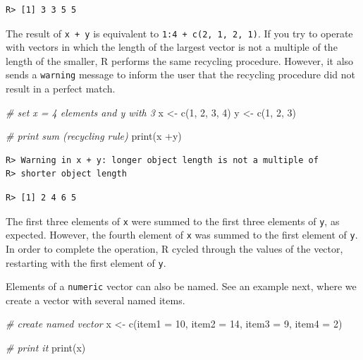 \documentclass[
  12pt,
]{book}
\newenvironment{Shaded}{\begin{snugshade}}{\end{snugshade}}
\newcommand{\AttributeTok}[1]{\textcolor[rgb]{0.61,0.61,0.61}{#1}}
\newcommand{\CommentTok}[1]{\textcolor[rgb]{0.37,0.37,0.37}{\textit{#1}}}
\newcommand{\DecValTok}[1]{\textcolor[rgb]{0.06,0.06,0.06}{#1}}
\newcommand{\FunctionTok}[1]{\textcolor[rgb]{0,0,0}{#1}}
\newcommand{\NormalTok}[1]{#1}
\newcommand{\OtherTok}[1]{\textcolor[rgb]{0.37,0.37,0.37}{#1}}
\newcommand{\SpecialCharTok}[1]{\textcolor[rgb]{0,0,0}{#1}}
\begin{document}
\begin{verbatim}
R> [1] 3 3 5 5
\end{verbatim}

The result of \texttt{x\ +\ y} is equivalent to \texttt{1:4\ +\ c(2,\ 1,\ 2,\ 1)}. If you try to operate with vectors in which the length of the largest vector is not a multiple of the length of the smaller, R performs the same recycling procedure. However, it also sends a \texttt{warning} message to inform the user that the recycling procedure did not result in a perfect match.

\begin{Shaded}
\begin{Highlighting}[]
\CommentTok{\# set x = 4 elements and y with 3}
\NormalTok{x }\OtherTok{\textless{}{-}} \FunctionTok{c}\NormalTok{(}\DecValTok{1}\NormalTok{, }\DecValTok{2}\NormalTok{, }\DecValTok{3}\NormalTok{, }\DecValTok{4}\NormalTok{)}
\NormalTok{y }\OtherTok{\textless{}{-}} \FunctionTok{c}\NormalTok{(}\DecValTok{1}\NormalTok{, }\DecValTok{2}\NormalTok{, }\DecValTok{3}\NormalTok{)}

\CommentTok{\# print sum (recycling rule)}
\FunctionTok{print}\NormalTok{(x }\SpecialCharTok{+}\NormalTok{y)}
\end{Highlighting}
\end{Shaded}

\begin{verbatim}
R> Warning in x + y: longer object length is not a multiple of
R> shorter object length
\end{verbatim}

\begin{verbatim}
R> [1] 2 4 6 5
\end{verbatim}

The first three elements of \texttt{x} were summed to the first three elements of \texttt{y}, as expected. However, the fourth element of \texttt{x} was summed to the first element of \texttt{y}. In order to complete the operation, R cycled through the values of the vector, restarting with the first element of \texttt{y}.

Elements of a \texttt{numeric} vector can also be named. See an example next, where we create a vector with several named items.

\begin{Shaded}
\begin{Highlighting}[]
\CommentTok{\# create named vector}
\NormalTok{x }\OtherTok{\textless{}{-}} \FunctionTok{c}\NormalTok{(}\AttributeTok{item1 =} \DecValTok{10}\NormalTok{, }
       \AttributeTok{item2 =} \DecValTok{14}\NormalTok{, }
       \AttributeTok{item3 =} \DecValTok{9}\NormalTok{, }
       \AttributeTok{item4 =} \DecValTok{2}\NormalTok{)}

\CommentTok{\# print it}
\FunctionTok{print}\NormalTok{(x)}
\end{Highlighting}
\end{Shaded}
\end{document}

